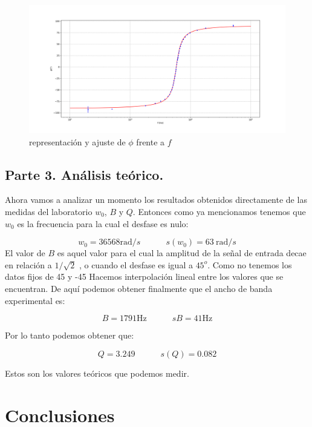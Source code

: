 \documentclass[12pt,a4paper]{article}
\newcommand{\Hz}{\mathrm{Hz} }
\newcommand{\tquad}{\quad \quad \quad}
\begin{document}
\begin{figure}[h!] \centering
\includegraphics[scale=0.45]{plot4.png}
\caption{representación y ajuste de $\phi$ frente a $f$}
\label{Fig:plot5}
\end{figure}

\subsection{Parte 3. Análisis teórico.}

Ahora vamos a analizar un momento los resultados obtenidos directamente de las medidas del laboratorio $w_0$, $B$ y $Q$. Entonces como ya mencionamos tenemos que $w_0$ es la frecuencia para la cual el desfase es nulo:

\begin{equation}
w_0 = 36568 \mathrm{rad}/s \tquad s(w_0) = 63 \ \mathrm{rad}/s
\end{equation}
El valor de $B$ es aquel valor para el cual la amplitud de la señal de entrada decae en relación a $1/\sqrt{2}$ , o cuando el desfase es igual a $45 ^o$. Como no tenemos los datos fijos de 45 y -45 Hacemos interpolación lineal entre los valores que se encuentran. De aquí podemos obtener finalmente que el ancho de banda experimental es:

\begin{equation}
B =  1791 \Hz \tquad sB = 41 \Hz
\end{equation}

Por lo tanto podemos obtener que:

\begin{equation}
Q = 3.249 \tquad s(Q) =  0.082
\end{equation}

Estos son los valores teóricos que podemos medir.

\section{Conclusiones}
\end{document}
